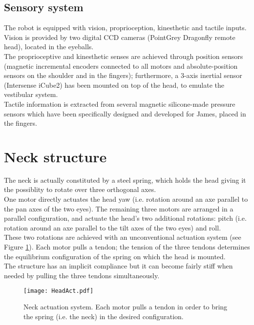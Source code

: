 \documentclass[9pt]{amsart}
\theoremstyle{definition}
\theoremstyle{remark}
\numberwithin{equation}{section}
\begin{document}
\subsection{Sensory system}

The robot is equipped with vision, proprioception, kinesthetic and tactile inputs.\\Vision is provided by two digital CCD cameras (PointGrey Dragonfly remote head), located in the eyeballs.\\The proprioceptive and kinesthetic senses are achieved through position sensors (magnetic incremental encoders connected to all motors and absolute-position sensors on the shoulder and in the fingers); furthermore, a 3-axis inertial sensor (Intersense iCube2) has been mounted on top of the head, to emulate the vestibular system.\\Tactile information is extracted from several magnetic silicone-made pressure sensors which have been specifically designed and developed for James, placed in the fingers.



\section{Neck structure} \label{Sec:NeckStructure}

The neck is actually constituted by a steel spring, which holds the head giving it the possiblity to rotate over three orthogonal axes.\\One motor directly actuates the head yaw (i.e. rotation around an axe parallel to the pan axes of the two eyes). The remaining three motors are arranged in a parallel configuration, and actuate the head's two additional rotations: pitch (i.e. rotation around an axe parallel to the tilt axes of the two eyes) and roll.\\These two rotations are achieved with an unconventional actuation system (see Figure \ref{Fig:HeadAct}). Each motor pulls a tendon; the tension of the three tendons determines the equilibrium configuration of the spring on which the head is mounted.\\The structure has an implicit compliance but it can become fairly stiff when needed by pulling the three tendons simultaneously.

\begin{figure}[tbp]
\centering
\texttt{[image: HeadAct.pdf]} 
\caption{Neck actuation system. Each motor pulls a tendon in order to bring the spring (i.e. the neck) in the desired configuration.}
\label{Fig:HeadAct}
\end{figure}
\end{document}
